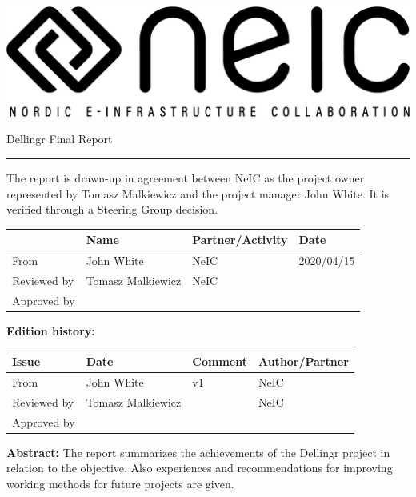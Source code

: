 \documentclass{article}
\newcommand{\dell}{Dellingr\xspace}
\begin{document}
\begin{center}
\includegraphics[width=\textwidth]{neic_logo_large.png}
\end{center}

\vspace{0.5in}
{\Huge  \dell Final Report} \hrule
\vspace{0.5in}

\noindent
{\large

{The report is drawn-up in agreement between NeIC as the project owner represented by Tomasz Malkiewicz and the project manager John White. 
It is verified through a Steering Group decision.
}
}

\begin{center}
\begin{tabular}{|l| l| l| l|} \hline

& Name
& Partner/Activity
& Date \\ \hline
From & 
John White &
NeIC & 
2020/04/15 \\ \hline
Reviewed by &
Tomasz Malkiewicz & 
NeIC & 
\\ \hline
Approved by &
 & 
 & 
\\ \hline
\end{tabular}
\end{center}

{\bf \large Edition history:}

\begin{center}
\begin{tabular}{|l| l| l| l|} \hline
Issue
& Date
& Comment
& Author/Partner \\ \hline
From & 
John White &
 v1 & 
 NeIC \\ \hline
Reviewed by &
Tomasz Malkiewicz & 
& 
NeIC \\ \hline
Approved by &
 & 
 & 
\\ \hline
\end{tabular}
\end{center}

{\bf \large Abstract:}
\noindent
{The report summarizes the achievements of the \dell project in relation to the objective. Also  experiences and recommendations for improving working methods for future projects are given.}
\end{document}
